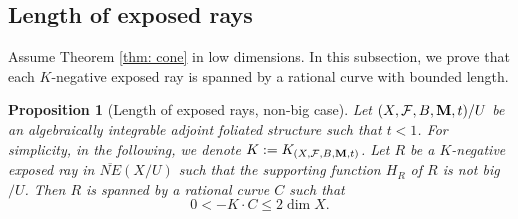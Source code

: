 \documentclass[12pt]{amsart}
\numberwithin{equation}{section}
\newcommand{\Mm}{{\bf{M}}}
\newcommand{\Ff}{\mathcal{F}}
\newtheorem{prop}[thm]{Proposition}
\theoremstyle{definition}
\theoremstyle{definition}
\theoremstyle{definition}
\begin{document}
\subsection{Length of exposed rays}

Assume Theorem \ref{thm: cone} in low dimensions. In this subsection, we prove that each $K$-negative exposed ray is spanned by a rational curve with bounded length.

\begin{prop}[Length of exposed rays, non-big case]\label{prop: cone non-big case}
Let $(X,\Ff,B,\Mm,t)/U$ be an algebraically integrable adjoint foliated structure such that $t<1$. For simplicity, in the following, we denote $K:=K_{(X,\Ff,B,\Mm,t)}$. Let $R$ be a $K$-negative exposed ray in $\overline{NE}(X/U)$ such that the supporting function $H_R$ of $R$ is not big$/U$. Then $R$ is spanned by a rational curve $C$ such that  $$0<-K\cdot C\leq 2\dim X.$$
\end{prop}
\end{document}
